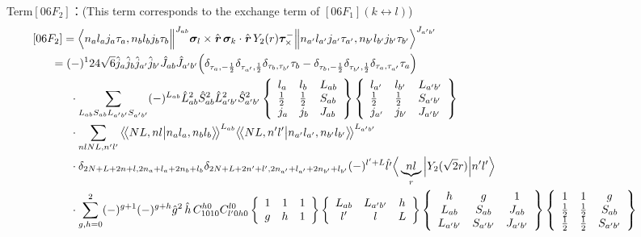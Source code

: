 \documentclass[master]{shnuthesis}
\newcommand{\llangle}{\big\langle\!\big\langle}
\newcommand{\rrangle}{\big\rangle\!\big\rangle}
\newcommand{\bmr}{\textbf{\textit{r}}}
\newcommand{\ap}{a^\prime}
\newcommand{\bp}{b^\prime}
\newcommand{\il}{\!\!\!\!\!\!\!\!\!\!}
\newcommand{\ii}{\!\!\!\!\!\!\!\!\!\!\!\!\!\!\!\!\!\!\!\!}
\begin{document}
{\color{red}Term$[06F_2]$：}(This term corresponds to the exchange term of $[06F_1]$$(k \longleftrightarrow l)$)
\begin{align}
    &\ii [06F_2] = \Big\langle n_a l_a j_a \tau_a, n_b l_b j_b \tau_b \Big\|^{J_{ab}} \bm{\sigma}_l \times \hat{\bmr}\, \bm{\sigma}_k \cdot \hat{\bmr}\, Y_2(r) \bm{\tau}_\times^- \Big\| n_{\ap} l_{\ap} j_{\ap} \tau_{\ap}, n_{\bp} l_{\bp} j_{\bp} \tau_{\bp} \Big\rangle^{J_{\ap \bp}} \\
    &\il = (-)^{1} 24\sqrt{6} \hat{j}_a\hat{j}_b\hat{j}_{\ap}\hat{j}_{\bp}\hat{J}_{ab}\hat{J}_{\ap\bp} \Big( \delta_{\tau_a,-\frac{1}{2}}\delta_{\tau_{\ap},\frac{1}{2}}\delta_{\tau_b,\tau_{\bp}}\tau_b - \delta_{\tau_b,-\frac{1}{2}}\delta_{\tau_{\bp},\frac{1}{2}}\delta_{\tau_a,\tau_{\ap}}\tau_a \Big) \notag\\
    & \cdot \sum_{L_{ab}S_{ab}L_{\ap\bp}S_{\ap\bp}} (-)^{L_{ab}} \hat{L}_{ab}^2\hat{S}_{ab}^2\hat{L}_{\ap\bp}^2\hat{S}_{\ap\bp}^2  \left\{\begin{array}{lll}l_{a} & l_{b} & L_{ab} \\ \frac{1}{2} & \frac{1}{2} & S_{ab} \\j_{a} & j_{b} & J_{ab} \end{array}\right\} \left\{\begin{array}{lll}l_{\ap} & l_{\bp} & L_{\ap\bp} \\ \frac{1}{2} & \frac{1}{2} & S_{\ap\bp} \\j_{\ap} & j_{\bp} & J_{\ap\bp} \end{array}\right\}  \notag \\
    & \cdot \sum_{nlNL,n^\prime l^\prime} \llangle N L, n l \big| n_{a} l_{a}, n_{b} l_{b} \rrangle^{L_{ab}} \llangle N L, n^\prime l^\prime \big| n_{a^\prime} l_{a^\prime}, n_{b^\prime} l_{b^\prime} \rrangle^{L_{\ap\bp}} \notag\\
    & \cdot \delta_{2N+L+2n+l,2n_a+l_a+2n_b+l_b}\delta_{2N+L+2n^\prime+l^\prime,2n_{a^\prime}+l_{a^\prime}+2n_{b^\prime}+l_{b^\prime}} (-)^{l^\prime+L}\hat{l^\prime}\Big\langle \underbrace{n l}_{r} \Big| Y_2(\sqrt{2}r) \Big| n^\prime l^\prime \Big\rangle \notag\\
    & \cdot \sum_{g,h=0}^2 (-)^{g+1}(-)^{g+h} \hat{g}^2\,\hat{h}\,  C_{1010}^{h0}C_{l^\prime 0 h 0}^{l0}  \left\{\begin{array}{ccc} 1 & 1 & 1 \\ g & h & 1 \end{array}\right\}  \left\{\begin{array}{ccc} L_{ab} & L_{\ap\bp} & h \\ l^\prime & l & L \end{array}\right\}  \left\{\begin{array}{ccc} h & g & 1 \\ L_{ab} & S_{ab} & J_{ab} \\ L_{\ap\bp} & S_{\ap\bp} & J_{\ap\bp} \end{array}\right\}  \left\{\begin{array}{ccc} 1 & 1 & g \\ \frac{1}{2} & \frac{1}{2} & S_{ab} \\ \frac{1}{2} & \frac{1}{2} & S_{\ap\bp} \end{array}\right\}  

\end{align}$$
\end{document}
